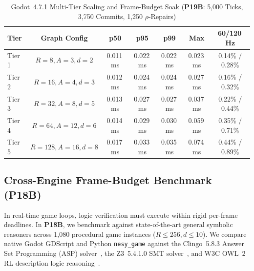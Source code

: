 \begin{table}[!tbp]
\caption{Godot~4.7.1 Multi-Tier Scaling and Frame-Budget Soak (\textbf{P19B}: 5,000 Ticks, 3,750 Commits, 1,250 $\rho$-Repairs)}
\label{tab:p19b-soak}
\centering
\scriptsize
\setlength{\tabcolsep}{2.2pt}
\begin{tabularx}{\columnwidth}{@{}>{\raggedright\arraybackslash}Xcccccc@{}}
\toprule
\textbf{Tier} & \textbf{Graph Config} & \textbf{p50} & \textbf{p95} & \textbf{p99} & \textbf{Max} & \textbf{60/120\,Hz} \\
\midrule
Tier 1 & $R{=}8, A{=}3, d{=}2$    & 0.011\,ms & 0.022\,ms & 0.022\,ms & 0.023\,ms & 0.14\% / 0.28\% \\
Tier 2 & $R{=}16, A{=}4, d{=}3$   & 0.012\,ms & 0.024\,ms & 0.024\,ms & 0.027\,ms & 0.16\% / 0.32\% \\
Tier 3 & $R{=}32, A{=}8, d{=}5$   & 0.013\,ms & 0.027\,ms & 0.027\,ms & 0.037\,ms & 0.22\% / 0.44\% \\
Tier 4 & $R{=}64, A{=}12, d{=}6$  & 0.014\,ms & 0.029\,ms & 0.030\,ms & 0.059\,ms & 0.35\% / 0.71\% \\
Tier 5 & $R{=}128, A{=}16, d{=}8$ & 0.017\,ms & 0.033\,ms & 0.035\,ms & 0.074\,ms & 0.44\% / 0.89\% \\
\bottomrule
\end{tabularx}
\end{table}

\subsection{Cross-Engine Frame-Budget Benchmark (\textbf{P18B})}\label{sec:tog-p18b}
In real-time game loops, logic verification must execute within rigid per-frame deadlines. In \textbf{P18B}, we benchmark \system{} against state-of-the-art general symbolic reasoners across 1,080 procedural game instances ($R \le 256, d \le 10$). We compare native Godot GDScript and Python \texttt{nesy\_game} against the Clingo~5.8.3 Answer Set Programming (ASP) solver~\cite{gebser2019clingo}, the Z3~5.4.1.0 SMT solver~\cite{demoura2008z3}, and W3C OWL~2 RL description logic reasoning~\cite{motik2012owl2profiles}.

